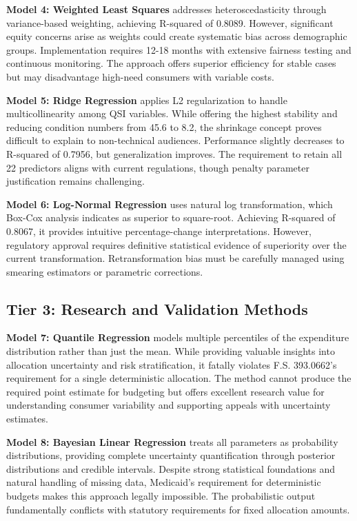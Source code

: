 \textbf{Model 4: Weighted Least Squares} addresses heteroscedasticity through variance-based weighting, achieving R-squared of 0.8089. However, significant equity concerns arise as weights could create systematic bias across demographic groups. Implementation requires 12-18 months with extensive fairness testing and continuous monitoring. The approach offers superior efficiency for stable cases but may disadvantage high-need consumers with variable costs.

\textbf{Model 5: Ridge Regression} applies L2 regularization to handle multicollinearity among QSI variables. While offering the highest stability and reducing condition numbers from 45.6 to 8.2, the shrinkage concept proves difficult to explain to non-technical audiences. Performance slightly decreases to R-squared of 0.7956, but generalization improves. The requirement to retain all 22 predictors aligns with current regulations, though penalty parameter justification remains challenging.

\textbf{Model 6: Log-Normal Regression} uses natural log transformation, which Box-Cox analysis indicates as superior to square-root. Achieving R-squared of 0.8067, it provides intuitive percentage-change interpretations. However, regulatory approval requires definitive statistical evidence of superiority over the current transformation. Retransformation bias must be carefully managed using smearing estimators or parametric corrections.

\subsection{Tier 3: Research and Validation Methods}

\textbf{Model 7: Quantile Regression} models multiple percentiles of the expenditure distribution rather than just the mean. While providing valuable insights into allocation uncertainty and risk stratification, it fatally violates F.S. 393.0662's requirement for a single deterministic allocation. The method cannot produce the required point estimate for budgeting but offers excellent research value for understanding consumer variability and supporting appeals with uncertainty estimates.

\textbf{Model 8: Bayesian Linear Regression} treats all parameters as probability distributions, providing complete uncertainty quantification through posterior distributions and credible intervals. Despite strong statistical foundations and natural handling of missing data, Medicaid's requirement for deterministic budgets makes this approach legally impossible. The probabilistic output fundamentally conflicts with statutory requirements for fixed allocation amounts.

